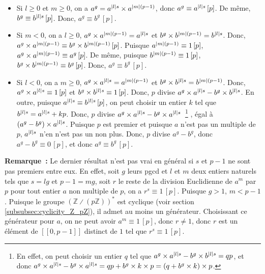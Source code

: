 \begin{itemize}[nosep]
    \item Si $l \geq 0$ et $m \geq 0$, on a $a^g = a^{\left\lvert l \right\rvert s} \times a^{\left\lvert m \right\rvert (p-1)}$, donc $a^g \equiv a^{\left\lvert l \right\rvert s} \, [p]$.
        De même, $b^g \equiv b^{\left\lvert l \right\rvert s} \, [p]$.
        Donc, $a^g \equiv b^g \, [p]$.
    \item Si $m < 0$, on a $l \geq 0$, $a^g \times a^{\left\lvert m \right\rvert (p-1)} = a^{\left\lvert l \right\rvert s}$ et $b^g \times b^{\left\lvert m \right\rvert (p-1)} = b^{\left\lvert l \right\rvert s}$.
        Donc, $a^g \times a^{\left\lvert m \right\rvert (p-1)} \equiv b^g \times b^{\left\lvert m \right\rvert (p-1)} \, [p]$. 
        Puisque $a^{\left\lvert m \right\rvert (p-1)} \equiv 1 \, [p]$, $a^g \times a^{\left\lvert m \right\rvert (p-1)} \equiv a^g \, [p]$.
        De même, puisque $b^{\left\lvert m \right\rvert (p-1)} \equiv 1 \, [p]$, $b^g \times b^{\left\lvert m \right\rvert (p-1)} \equiv b^g \, [p]$.
        Donc, $a^g \equiv b^g \, [p]$.
    \item Si $l < 0$, on a $m \geq 0$, $a^g \times a^{\left\lvert l \right\rvert s} = a^{\left\lvert m \right\rvert (p-1)}$ et $b^g \times b^{\left\lvert l \right\rvert s} = b^{\left\lvert m \right\rvert (p-1)}$.
        Donc, $a^g \times a^{\left\lvert l \right\rvert s} \equiv 1 \, [p]$ et $b^g \times b^{\left\lvert l \right\rvert s} \equiv 1 \, [p]$. 
        Donc, $p$ divise $a^g \times a^{\left\lvert l \right\rvert s} - b^g \times b^{\left\lvert l \right\rvert s}$. 
        En outre, puisque $a^{\left\lvert l \right\rvert s} \equiv b^{\left\lvert l \right\rvert s} \, [p]$, on peut choisir un entier $k$ tel que $b^{\left\lvert l \right\rvert s} = a^{\left\lvert l \right\rvert s} + k p$.
        Donc, $p$ divise $a^g \times a^{\left\lvert l \right\rvert s} - b^g \times a^{\left\lvert l \right\rvert s}$~\footnote{
            En effet, on peut choisir un entier $q$ tel que $a^g \times a^{\left\lvert l \right\rvert s} - b^g \times b^{\left\lvert l \right\rvert s} = q p$, et donc $a^g \times a^{\left\lvert l \right\rvert s} - b^g \times a^{\left\lvert l \right\rvert s} = q p + b^g \times k \times p = (q + b^g \times k) \times p$.
        }%
        , égal à $(a^g - b^g) \times a^{\left\lvert l \right\rvert s}$. 
        Puisque $p$ est premier et puisque $a$ n'est pas un multiple de $p$, $a^{\left\lvert l \right\rvert s}$ n'en n'est pas un non plus.
        Donc, $p$ divise $a^g - b^g$, donc $a^g - b^g \equiv 0 \, [p]$, et donc $a^g \equiv b^g \, [p]$.
\end{itemize}

\done

\medskip

\noindent\textbf{Remarque :} Le dernier résultat n'est pas vrai en général si $s$ et $p-1$ ne sont pas premiers entre eux.
    En effet, soit $g$ leurs pgcd et $l$ et $m$ deux entiers naturels tels que $s = l g$ et $p-1 = m g$, soit $r$ le reste de la division Euclidienne de $a^m$ par $p$ pour tout entier $a$ non multiple de $p$, on a $r^s \equiv 1 \, [p]$. 
    Puisque $g > 1$, $m < p-1$. 
    Puisque le groupe $(\mathbb{Z} \divslash (p \mathbb{Z}))^*$ est cyclique (voir section \ref{subsubsec:cyclicity_Z_pZ}), il admet au moins un générateur. 
    Choisissant ce générateur pour $a$, on ne peut avoir $a^m \equiv 1 \, [p]$, donc $r \neq 1$, donc $r$ est un élément de $[\![0, p-1]\!]$ distinct de $1$ tel que $r^s \equiv 1 \, [p]$.
